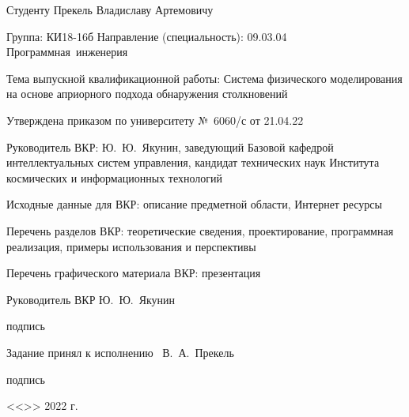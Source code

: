{
Студенту Прекель Владиславу Артемовичу

Группа: КИ18-16б Направление (специальность): 09.03.04 Программная~инженерия

Тема выпускной квалификационной работы: Система физического моделирования на основе априорного подхода обнаружения столкновений

Утверждена приказом по университету №~6060/с от 21.04.22

Руководитель ВКР: Ю.~Ю.~Якунин, заведующий Базовой кафедрой интеллектуальных систем управления, кандидат технических наук
Института космических и информационных технологий

Исходные данные для ВКР: описание предметной области, Интернет ресурсы

Перечень разделов ВКР: теоретические сведения, проектирование, программная реализация, примеры использования и перспективы

Перечень графического материала ВКР: презентация

\vfill

\setlength{\parindent}{0cm}
\begin{spacing}{1}
Руководитель ВКР
\hfill
\uline{\hspace{10.5ex}}
\hspace{6ex}
Ю.~Ю.~Якунин

\vspace{-4pt}

\hfill
{\footnotesize подпись}
\hspace{23ex}


Задание принял к исполнению~
\hfill
\uline{\hspace{10.5ex}}
\hspace{7ex}
В.~А.~Прекель

\vspace{-4pt}

\hfill
{\footnotesize подпись}
\hspace{23ex}

\vspace{1em}

\hfill <<\uline{\hspace{3ex}}>> \uline{\hspace{9ex}} 2022 г.

\end{spacing}
}

\thispagestyle{empty}

\clearpage
